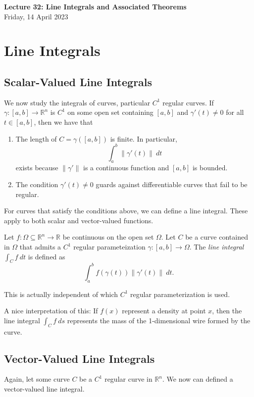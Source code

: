\documentclass[11pt]{article}
\theoremstyle{definition}
\newcommand{\R}{\mathbb{R}}                      %
\begin{document}
\thispagestyle{empty}

\begin{center}
{\LARGE \bf Lecture 32: Line Integrals and Associated Theorems}\\
{\large Friday, 14 April 2023}\\
\end{center}
\section{Line Integrals}
\subsection{Scalar-Valued Line Integrals}
We now study the integrals of curves, particular $C^1$ regular curves. If $\gamma:[a,b]\to \R^n$ is $C^1$ on some open set containing $[a,b]$ and $\gamma'(t)\neq 0$ for all $t\in[a,b]$, then we have that
\begin{enumerate}
    \item The length of $C = \gamma([a,b])$ is finite. In particular, 
    $$
    \int_a^b \|\gamma' (t)\|~dt
    $$
    exists because $\|\gamma'\|$ is a continuous function and $[a,b]$ is bounded.
    \item The condition $\gamma'(t)\neq 0$ guards against differentiable curves that fail to be regular.
\end{enumerate}
For curves that satisfy the conditions above, we can define a line integral. These apply to both scalar and vector-valued functions. 

\begin{mdframed}[backgroundcolor = blue!10]
\vspace{+0.1cm}
 Let $f:\Omega\subseteq \R^n\to \R$ be continuous on the open set $\Omega$. Let $C$ be a curve contained in $\Omega$ that admits a $C^1$ regular parameteization $\gamma:[a,b]\to \Omega$. The \textit{line integral} $\int_C f~dt$ is defined as 
$$
\int_a^b f(\gamma(t))\|\gamma'(t)\|~dt.
$$
\end{mdframed}
\note This is actually independent of which $C^1$ regular parameterization is used.

A nice interpretation of this: If $f(x)$ represent a density at point $x$, then the line integral $\int_C f~ds$ represents the mass of the 1-dimensional wire formed by the curve.

\subsection{Vector-Valued Line Integrals}
Again, let some curve $C$ be a $C^1$ regular curve in $\R^n$. We now can defined a vector-valued line integral.
\end{document}
